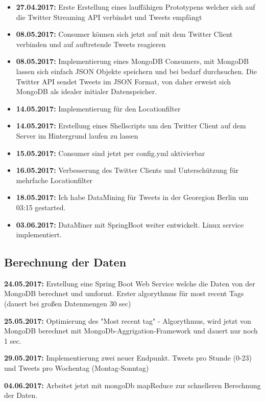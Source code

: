 \documentclass[12pt, 
	a4paper, 
	oneside, 
	leqno]{scrreprt}
\begin{document}
\begin{itemize}
  \item \textbf{27.04.2017:} Erste Erstellung eines lauffähigen Prototypens welcher sich auf die Twitter Streaming API verbindet und Tweets empfängt
  \item \textbf{08.05.2017:} Consumer können sich jetzt auf mit dem Twitter Client verbinden und auf auftretende Tweets reagieren
  \item \textbf{08.05.2017:} Implementierung eines MongoDB Consumers, mit MongoDB lassen sich einfach JSON Objekte speichern und bei bedarf durchsuchen. Die Twitter API sendet Tweets im JSON Format, von daher erweist sich MongoDB als idealer initialer Datenspeicher.
  \item \textbf{14.05.2017:} Implementierung für den Locationfilter
  \item \textbf{14.05.2017:} Erstellung eines Shellscripts um den Twitter Client auf dem Server im Hintergrund laufen zu lassen
  \item \textbf{15.05.2017:} Consumer sind jetzt per config.yml aktivierbar
  \item \textbf{16.05.2017:} Verbesserung des Twitter Clients und Unterschützung für mehrfache Locationfilter
  \item \textbf{18.05.2017:} Ich habe DataMining für Tweets in der Georegion Berlin um 03:15 gestarted.
  \item \textbf{03.06.2017:} DataMiner mit SpringBoot weiter entwickelt. Linux service implementiert.
\end{itemize}

\subsection*{Berechnung der Daten}
  \item \textbf{24.05.2017:} Erstellung eine Spring Boot Web Service welche die Daten von der MongoDB berechnet und umformt. Erster algorythmus für most recent Tags (dauert bei großen Datenmengen 30 sec)
  \item \textbf{25.05.2017:} Optimierung des "Most recent tag" - Algorythmus, wird jetzt von MongoDB berechnet mit MongoDb-Aggrigation-Framework und dauert nur noch 1 sec.
  \item \textbf{29.05.2017:} Implementierung zwei neuer Endpunkt. Tweets pro Stunde (0-23) und Tweets pro Wochentag (Montag-Sonntag)
  \item \textbf{04.06.2017:} Arbeitet jetzt mit mongoDb mapReduce zur schnelleren Berechnung der Daten.
\end{document}
